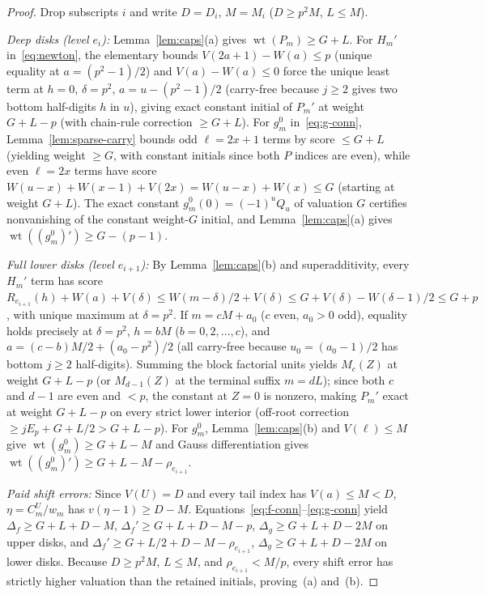 \documentclass[11pt,reqno]{amsart}
\numberwithin{equation}{section}
\theoremstyle{definition}
\theoremstyle{remark}
\newcommand{\wt}{\operatorname{wt}}
\begin{document}
\begin{proof}
Drop subscripts $i$ and write $D=D_i$, $M=M_i$ ($D\ge p^2 M$, $L\le M$).

\smallskip
\noindent\emph{Deep disks (level $e_i$):} Lemma~\ref{lem:caps}(a) gives $\wt(P_m)\ge G+L$. For $H_m'$ in~\eqref{eq:newton}, the elementary bounds $V(2a+1)-W(a)\le p$ (unique equality at $a=(p^2-1)/2$) and $V(a)-W(a)\le 0$ force the unique least term at $h=0$, $\delta=p^2$, $a=u-(p^2-1)/2$ (carry-free because $j\ge 2$ gives two bottom half-digits $h$ in $u$), giving exact constant initial of $P_m'$ at weight $G+L-p$ (with chain-rule correction $\ge G+L$). For $g_m^0$ in~\eqref{eq:g-conn}, Lemma~\ref{lem:sparse-carry} bounds odd $\ell=2x+1$ terms by score $\le G+L$ (yielding weight $\ge G$, with constant initials since both $P$ indices are even), while even $\ell=2x$ terms have score $W(u-x)+W(x-1)+V(2x) = W(u-x)+W(x)\le G$ (starting at weight $G+L$). The exact constant $g_m^0(0)=(-1)^u Q_u$ of valuation $G$ certifies nonvanishing of the constant weight-$G$ initial, and Lemma~\ref{lem:caps}(a) gives $\wt((g_m^0)')\ge G-(p-1)$.

\smallskip
\noindent\emph{Full lower disks (level $e_{i+1}$):} By Lemma~\ref{lem:caps}(b) and superadditivity, every $H_m'$ term has score $R_{e_{i+1}}(h)+W(a)+V(\delta)\le W(m-\delta)/2+V(\delta)\le G+V(\delta)-W(\delta-1)/2\le G+p$, with unique maximum at $\delta=p^2$. If $m=cM+a_0$ ($c$ even, $a_0>0$ odd), equality holds precisely at $\delta=p^2$, $h=bM$ ($b=0,2,\ldots,c$), and $a=(c-b)M/2+(a_0-p^2)/2$ (all carry-free because $u_0=(a_0-1)/2$ has bottom $j\ge 2$ half-digits). Summing the block factorial units yields $M_c(Z)$ at weight $G+L-p$ (or $M_{d-1}(Z)$ at the terminal suffix $m=dL$); since both $c$ and $d-1$ are even and $<p$, the constant at $Z=0$ is nonzero, making $P_m'$ exact at weight $G+L-p$ on every strict lower interior (off-root correction $\ge jE_p+G+L/2 > G+L-p$). For $g_m^0$, Lemma~\ref{lem:caps}(b) and $V(\ell)\le M$ give $\wt(g_m^0)\ge G+L-M$ and Gauss differentiation gives $\wt((g_m^0)')\ge G+L-M-\rho_{e_{i+1}}$.

\smallskip
\noindent\emph{Paid shift errors:} Since $V(U)=D$ and every tail index has $V(a)\le M<D$, $\eta=C_m^U/w_m$ has $v(\eta-1)\ge D-M$. Equations~\eqref{eq:f-conn}--\eqref{eq:g-conn} yield $\Delta_f\ge G+L+D-M$, $\Delta_f'\ge G+L+D-M-p$, $\Delta_g\ge G+L+D-2M$ on upper disks, and $\Delta_f'\ge G+L/2+D-M-\rho_{e_{i+1}}$, $\Delta_g\ge G+L+D-2M$ on lower disks. Because $D\ge p^2 M$, $L\le M$, and $\rho_{e_{i+1}} < M/p$, every shift error has strictly higher valuation than the retained initials, proving~(a) and~(b).
\end{proof}
\end{document}
